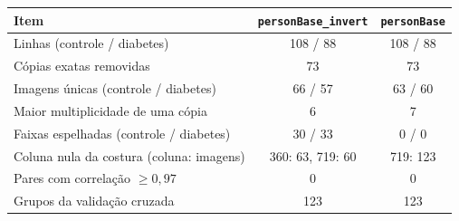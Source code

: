 \begin{tabular}{lcc}
\toprule
Item & \texttt{personBase\_invert} & \texttt{personBase} \\
\midrule
Linhas (controle / diabetes) & 108 / 88 & 108 / 88 \\
Cópias exatas removidas & 73 & 73 \\
Imagens únicas (controle / diabetes) & 66 / 57 & 63 / 60 \\
Maior multiplicidade de uma cópia & 6 & 7 \\
Faixas espelhadas (controle / diabetes) & 30 / 33 & 0 / 0 \\
Coluna nula da costura (coluna: imagens) & 360: 63, 719: 60 & 719: 123 \\
Pares com correlação $\geq 0{,}97$ & 0 & 0 \\
Grupos da validação cruzada & 123 & 123 \\
\bottomrule
\end{tabular}
